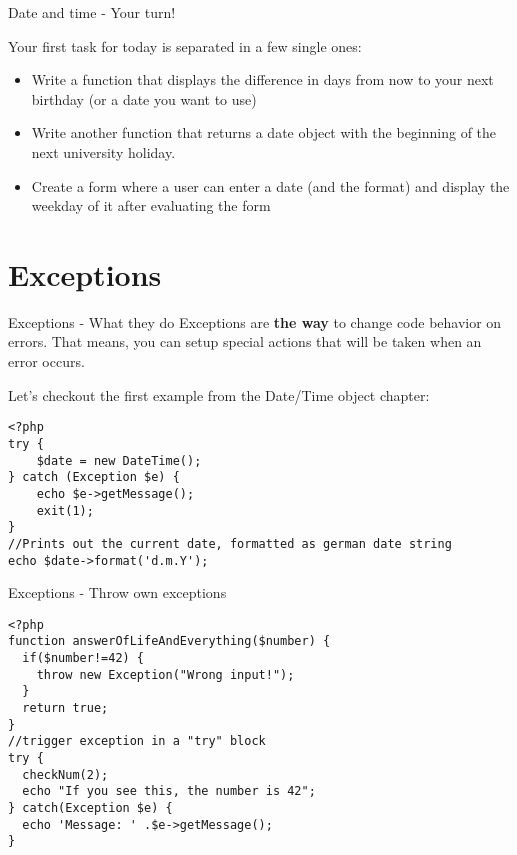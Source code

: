 \begin{frame}[fragile]{Date and time - Your turn!}

Your first task for today is separated in a few single ones:

\begin{itemize}
\item Write a function that displays the difference in days from now to your next birthday (or a date you want to use) \pause
\item Write another function that returns a date object with the beginning of the next university holiday. \pause
\item Create a form where a user can enter a date (and the format) and display the weekday of it after evaluating the form
\end{itemize}

\end{frame}

\section{Exceptions}

\begin{frame}[fragile]{Exceptions - What they do}
Exceptions are \textbf{the way} to change code behavior on errors. That means, you can setup special actions that will be taken when an error occurs. \pause

Let's checkout the first example from the Date/Time object chapter:

\begin{lstlisting}
<?php
try {
    $date = new DateTime();
} catch (Exception $e) {
    echo $e->getMessage();
    exit(1);
}
//Prints out the current date, formatted as german date string
echo $date->format('d.m.Y');
\end{lstlisting}

\end{frame}

\begin{frame}[fragile]{Exceptions - Throw own exceptions}

\begin{lstlisting}
<?php
function answerOfLifeAndEverything($number) {
  if($number!=42) {
    throw new Exception("Wrong input!");
  }
  return true;
}
//trigger exception in a "try" block
try {
  checkNum(2);
  echo "If you see this, the number is 42";
} catch(Exception $e) {
  echo 'Message: ' .$e->getMessage();
}
\end{lstlisting}

\end{frame}


